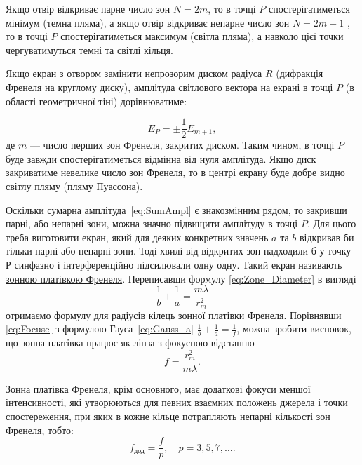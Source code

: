 Якщо отвір відкриває парне число зон $N = 2m$, то в точці $P$ спостерігатиметься мінімум (темна пляма), а якщо отвір відкриває непарне число зон  $N = 2m + 1$ , то в точці $P$ спостерігатиметься максимум (світла пляма), а навколо цієї точки чергуватимуться темні та світлі кільця.

Якщо екран з отвором замінити непрозорим диском радіуса $R$ (дифракція Френеля на круглому диску), амплітуда світлового вектора на екрані в точці $P$ (в області геометричної тіні) дорівнюватиме:

\begin{equation}\label{eq:Amplitide_of_disk}
    E_P = \pm \frac12 E_{m+1},
\end{equation}
де $ m $ --- число перших зон Френеля, закритих диском.
Таким чином, в точці $P$ буде завжди спостерігатиметься відмінна від нуля амплітуда. Якщо диск закриватиме невелике число зон Френеля, то в центрі екрану буде добре видно світлу пляму (\href{https://www.youtube.com/watch?v=xHHhbR5evq0&ab_channel=InstitutFresnel}{пляму Пуассона}).

Оскільки сумарна амплітуда~\eqref{eq:SumAmpl} є знакозмінним рядом, то закривши парні, або непарні зони, можна значно підвищити амплітуду в точці $P$. Для цього треба виготовити екран, який для деяких конкретних значень $a$ та $b$ відкривав би тільки парні або непарні зони. Тоді хвилі від відкритих зон надходили б у точку $Р$ синфазно і інтерференційно підсилювали одну одну. Такий екран називають \href{https://www.youtube.com/watch?v=aJ4NfUmg16c&ab_channel=mynameismunka2}{зонною платівкою Френеля}. Переписавши формулу \eqref{eq:Zone_Diameter} в вигляді
\begin{equation}\label{eq:Focuse}
    \frac1b+\frac1a=\frac{m\lambda}{r_{m}^{2}}
\end{equation}
отримаємо формулу для радіусів кілець зонної платівки Френеля. Порівнявши \eqref{eq:Focuse} з формулою Гауса~\eqref{eq:Gauss_a} $\frac1b + \frac1a  = \frac1f$, можна зробити висновок, що зонна платівка працює як лінза з фокусною відстанню
\begin{equation}
    f=\frac{r^{2}_{m}}{m\lambda}.
\end{equation}

Зонна платівка Френеля, крім основного, має додаткові фокуси меншої інтенсивності, які утворюються для певних взаємних положень джерела і точки спостереження, при яких в кожне кільце потрапляють непарні кількості зон Френеля, тобто:
\begin{equation*}
    f_\text{дод} = \frac{f}{p}, \quad p = 3, 5, 7,\ldots.
\end{equation*}

